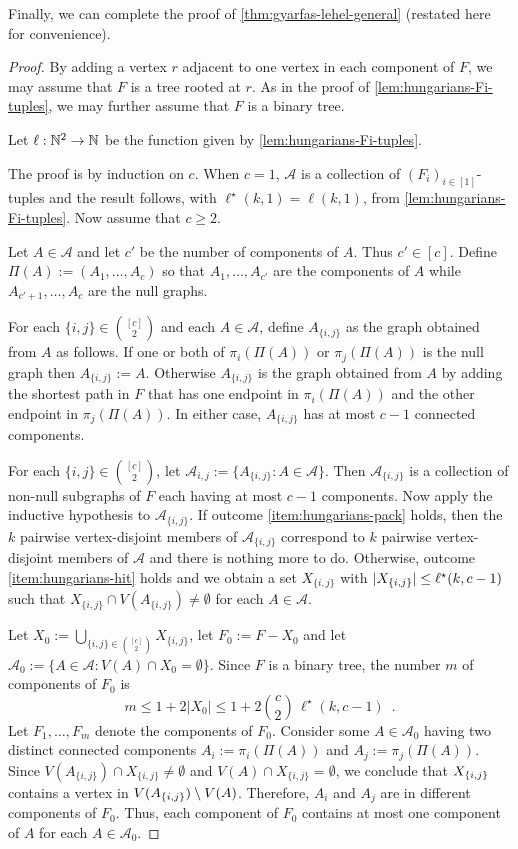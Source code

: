 \documentclass{patmorin}
\DeclarePairedDelimiter\set{\{}{\}}
\renewcommand{\mid}{:}  %
\begin{document}
Finally, we can complete the proof of \cref{thm:gyarfas-lehel-general} (restated here for convenience).

\hungarians*
\begin{proof}
  By adding a vertex $r$ adjacent to one vertex in each component of $F$, we may assume that $F$ is a tree rooted at $r$.  As in the proof of \cref{lem:hungarians-Fi-tuples}, we may further assume that $F$ is a binary tree.

  Let $\ell:\mathbb{N}^2\to\mathbb{N}$ be the function given by \cref{lem:hungarians-Fi-tuples}.

  The proof is by induction on $c$.  When $c=1$, $\mathcal{A}$ is a collection of $(F_i)_{i\in[1]}$-tuples and the result follows, with $\ell^\star(k,1)=\ell(k,1)$, from \cref{lem:hungarians-Fi-tuples}.  Now assume that $c\ge 2$.

  Let $A\in\mathcal{A}$ and let $c'$ be the number of components of $A$. Thus $c'\in[c]$. Define $\Pi(A):=(A_1,\ldots,A_c)$ so that $A_1,\ldots,A_{c'}$ are the components of $A$ while $A_{c'+1},\ldots,A_c$ are the null graphs.

  For each $\{i,j\}\in\binom{[c]}{2}$ and each $A\in\mathcal{A}$, define $A_{\{i,j\}}$ as the graph obtained from $A$ as follows.  If one or both of $\pi_i(\Pi(A))$ or $\pi_j(\Pi(A))$ is the null graph then $A_{\{i,j\}}:=A$. Otherwise $A_{\{i,j\}}$ is the graph obtained from $A$ by adding the shortest path in $F$ that has one endpoint in $\pi_i(\Pi(A))$ and the other endpoint in $\pi_j(\Pi(A))$.  In either case, $A_{\{i,j\}}$ has at most $c-1$ connected components.

  For each $\{i,j\}\in\binom{[c]}{2}$, let $\mathcal{A}_{i,j}:=\{A_{\{i,j\}}\mid A\in \mathcal{A}\}$.  Then $\mathcal{A}_{\{i,j\}}$ is a collection of non-null subgraphs of $F$ each having at most $c-1$ components.  Now apply the inductive hypothesis to $\mathcal{A}_{\{i,j\}}$.  If outcome \cref{item:hungarians-pack} holds, then the $k$ pairwise vertex-disjoint members of $\mathcal{A}_{\{i,j\}}$ correspond to $k$ pairwise vertex-disjoint members of $\mathcal{A}$ and there is nothing more to do. Otherwise, outcome \cref{item:hungarians-hit} holds and we obtain a set $X_{\{i,j\}}$ with $|X_{\set{i,j}}|\leq \ell^\star(k,c-1)$ such that $X_{\{i,j\}}\cap V(A_{\{i,j\}})\neq\emptyset$ for each $A\in\mathcal{A}$.


  Let $X_0:=\bigcup_{\{i,j\}\in\binom{[c]}{2}} X_{\{i,j\}}$, let $F_0:=F-X_0$ and let $\mathcal{A}_0:=\{A\in\mathcal{A}\mid V(A)\cap X_0=\emptyset\}$.  Since $F$ is a binary tree, the number $m$ of components of $F_0$ is
  \begin{equation}
    \textstyle m \leq 1+2|X_0|\le 1+2\binom{c}{2}\,\ell^\star(k,c-1) \enspace .
  \end{equation}
  Let $F_1,\ldots,F_m$ denote the components of $F_0$. Consider some $A\in\mathcal{A}_0$ having two distinct connected components $A_i:=\pi_i(\Pi(A))$ and $A_j:=\pi_j(\Pi(A))$.  Since $V(A_{\{i,j\}})\cap X_{\{i,j\}}\neq\emptyset$ and $V(A)\cap X_{\{i,j\}}=\emptyset$, we conclude that $X_{\set{i,j}}$ contains a vertex in $V(A_{\set{i,j}})\setminus V(A)$. Therefore, $A_i$ and $A_j$ are in different components of $F_0$.  Thus, each component of $F_0$ contains at most one component of $A$ for each $A\in\mathcal{A}_0$.


\end{proof}
\end{document}
